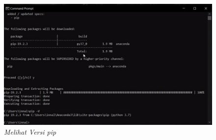 \begin{enumerate}
\begin{figure}[H]
    \includegraphics[scale=0.5]{figures/pipversion}
    \caption{\textit{Melihat Versi pip}}
    \label{Figureanaconda70}
\end{figure}

\end{enumerate}


